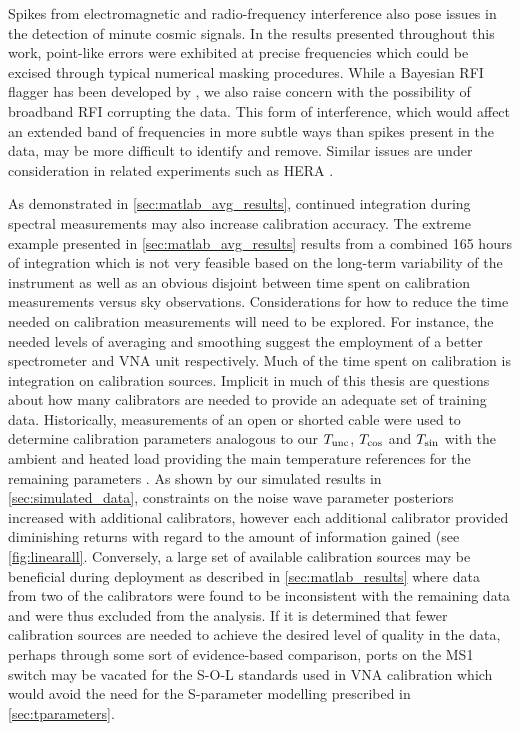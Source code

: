 Spikes from electromagnetic and radio-frequency interference also pose issues in the detection of minute cosmic signals. In the results presented throughout this work, point-like errors were exhibited at precise frequencies which could be excised through typical numerical masking procedures. While a Bayesian RFI flagger has been developed by \citet{sam_rfi}, we also raise concern with the possibility of broadband RFI corrupting the data. This form of interference, which would affect an extended band of frequencies in more subtle ways than spikes present in the data, may be more difficult to identify and remove. Similar issues are under consideration in related experiments such as HERA \citep{hera_rfi}.

As demonstrated in \cref{sec:matlab_avg_results}, continued integration during spectral measurements may also increase calibration accuracy. The extreme example presented in \cref{sec:matlab_avg_results} results from a combined 165 hours of integration which is not very feasible based on the long-term variability of the instrument as well as an obvious disjoint between time spent on calibration measurements versus sky observations. Considerations for how to reduce the time needed on calibration measurements will need to be explored. For instance, the needed levels of averaging and smoothing suggest the employment of a better spectrometer and VNA unit respectively. Much of the time spent on calibration is integration on calibration sources. Implicit in much of this thesis are questions about how many calibrators are needed to provide an adequate set of training data. Historically, measurements of an open or shorted cable were used to determine calibration parameters analogous to our $T_{\mathrm{unc}}$, $T_{\mathrm{cos}}$ and $T_{\mathrm{sin}}$ \citep{rogersCal} with the ambient and heated load providing the main temperature references for the remaining parameters \citep{edgesCal}. As shown by our simulated results in \cref{sec:simulated_data}, constraints on the noise wave parameter posteriors increased with additional calibrators, however each additional calibrator provided diminishing returns with regard to the amount of information gained (see \cref{fig:linearall}. Conversely, a large set of available calibration sources may be beneficial during deployment as described in \cref{sec:matlab_results} where data from two of the calibrators were found to be inconsistent with the remaining data and were thus excluded from the analysis. If it is determined that fewer calibration sources are needed to achieve the desired level of quality in the data, perhaps through some sort of evidence-based comparison, ports on the MS1 switch may be vacated for the S-O-L standards used in VNA calibration which would avoid the need for the S-parameter modelling prescribed in \cref{sec:tparameters}.


